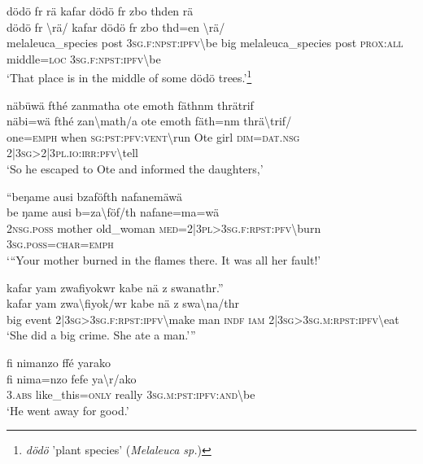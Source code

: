 \ea\label{ex:7:a4835}
dödö fr rä kafar dödö fr zbo thden rä\\
\gll dödö	fr	{\textbackslash}rä/	kafar	dödö	fr	zbo	thd=en	{\textbackslash}rä/\\
     melaleuca\_species	post	3\textsc{sg}.\textsc{f}:\textsc{npst}:\textsc{ipfv}{\textbackslash}be	big	melaleuca\_species	post	\textsc{prox}:\textsc{all}	middle=\textsc{loc}	3\textsc{sg}.\textsc{f}:\textsc{npst}:\textsc{ipfv}{\textbackslash}be\\
\glt `That place is in the middle of some dödö trees.'\footnote{\textit{dödö} 'plant species' (\textit{Melaleuca sp.})}
\z

\ea\label{ex:7:a4836}
näbüwä fthé zanmatha ote emoth fäthnm thrätrif\\
\gll näbi=wä	fthé	zan{\textbackslash}math/a	ote	emoth	fäth=nm	thrä{\textbackslash}trif/\\
     one=\textsc{emph}	when	\textsc{sg}:\textsc{pst}:\textsc{pfv}:\textsc{vent}{\textbackslash}run	Ote	girl	\textsc{dim}=\textsc{dat}.\textsc{nsg}	2|3\textsc{sg}>2|3\textsc{pl}.\textsc{io}:\textsc{irr}:\textsc{pfv}{\textbackslash}tell\\
\glt `So he escaped to Ote and informed the daughters,'
\z

\newpage
\ea\label{ex:7:a4838}
``beŋame ausi bzaföfth nafanemäwä\\
\gll be	ŋame	ausi	b=za{\textbackslash}föf/th	nafane=ma=wä\\
     2\textsc{nsg}.\textsc{poss}	mother	old\_woman	\textsc{med}=2|3\textsc{pl}>3\textsc{sg}.\textsc{f}:\textsc{rpst}:\textsc{pfv}{\textbackslash}burn	3\textsc{sg}.\textsc{poss}=\textsc{char}=\textsc{emph}\\
\glt `{``}Your mother burned in the flames there. It was all her fault!'
\z

\ea\label{ex:7:a4841}
kafar yam zwafiyokwr kabe nä z swanathr.''\\
\gll kafar	yam	zwa{\textbackslash}fiyok/wr	kabe	nä	z	swa{\textbackslash}na/thr\\
     big	event	2|3\textsc{sg}>3\textsc{sg}.\textsc{f}:\textsc{rpst}:\textsc{ipfv}{\textbackslash}make	man	\textsc{indf}	\textsc{iam}	2|3\textsc{sg}>3\textsc{sg}.\textsc{m}:\textsc{rpst}:\textsc{ipfv}{\textbackslash}eat\\
\glt `She did a big crime. She ate a man.'''
\z

\ea\label{ex:7:a4843}
fi nimanzo ffé yarako\\
\gll fi	nima=nzo	fefe	ya{\textbackslash}r/ako\\
     3.\textsc{abs}	like\_this=\textsc{only}	really	3\textsc{sg}.\textsc{m}:\textsc{pst}:\textsc{ipfv}:\textsc{and}{\textbackslash}be\\
\glt `He went away for good.'
\z

